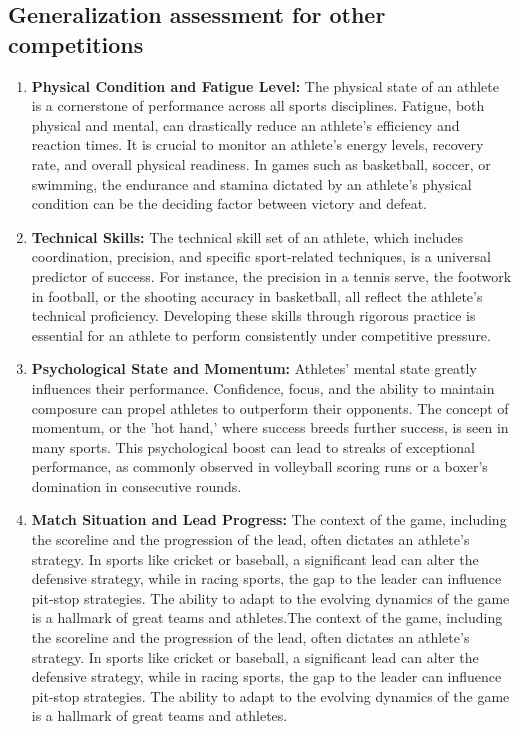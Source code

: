 \documentclass{article}
\begin{document}
\subsection{Generalization assessment for other competitions}
\begin{enumerate}
      \item \textbf{Physical Condition and Fatigue Level:} The physical state of an athlete is a cornerstone of performance across all sports disciplines. Fatigue, both physical and mental, can drastically reduce an athlete's efficiency and reaction times. It is crucial to monitor an athlete's energy levels, recovery rate, and overall physical readiness. In games such as basketball, soccer, or swimming, the endurance and stamina dictated by an athlete's physical condition can be the deciding factor between victory and defeat.
      \item \textbf{Technical Skills:} The technical skill set of an athlete, which includes coordination, precision, and specific sport-related techniques, is a universal predictor of success. For instance, the precision in a tennis serve, the footwork in football, or the shooting accuracy in basketball, all reflect the athlete's technical proficiency. Developing these skills through rigorous practice is essential for an athlete to perform consistently under competitive pressure.
      \item \textbf{Psychological State and Momentum:} Athletes' mental state greatly influences their performance. Confidence, focus, and the ability to maintain composure can propel athletes to outperform their opponents. The concept of momentum, or the 'hot hand,' where success breeds further success, is seen in many sports. This psychological boost can lead to streaks of exceptional performance, as commonly observed in volleyball scoring runs or a boxer's domination in consecutive rounds.
      \item \textbf{Match Situation and Lead Progress:} The context of the game, including the scoreline and the progression of the lead, often dictates an athlete's strategy. In sports like cricket or baseball, a significant lead can alter the defensive strategy, while in racing sports, the gap to the leader can influence pit-stop strategies. The ability to adapt to the evolving dynamics of the game is a hallmark of great teams and athletes.The context of the game, including the scoreline and the progression of the lead, often dictates an athlete's strategy. In sports like cricket or baseball, a significant lead can alter the defensive strategy, while in racing sports, the gap to the leader can influence pit-stop strategies. The ability to adapt to the evolving dynamics of the game is a hallmark of great teams and athletes.

\end{enumerate}
\end{document}
